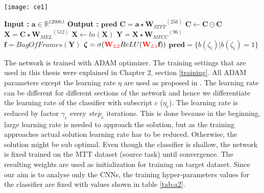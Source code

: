\begin{algorithm}
\begin{minipage}{0.15\textwidth}
\texttt{[image: ce1]}
\end{minipage}
  \begin{minipage}{0.80\textwidth}
  \caption{$\textbf{pred}$ = $Model$($\textbf{a}$) }\label{exp:a2}
  \begin{algorithmic}[1]
    \Statex \textbf{Input :} $\textbf{a} \in \mathbb{R}^{12000.t}$
    \Statex \textbf{Output :} $\textbf{pred}$ 
    \State $\textbf{C} = \textbf{a} \star {\textbf{W}_{STFT}}^{(256)}$ 
    \State $\textbf{C} \leftarrow \textbf{C} \odot \textbf{C}$
    \State $\textbf{X} = \textbf{C} \star {\textbf{W}_{MEL}}^{(512)}$ 
    \State $\textbf{X} \leftarrow ln(\textbf{X})$
    \State $\textbf{Y} = \textbf{X} \star {\textbf{W}_{MFCC}}^{(96)}$ 
    \State $\textbf{f} = BagOfFrames(\textbf{Y})$ 
    \State $\bm{\zeta} = \sigma ({\color{red} \textbf{W}_{L2}} ReLU ({\color{red}\textbf{W}_{L1}}\textbf{f})) $ 
    \State $\textbf{pred} = \{ b(\zeta_{i}) | b(\zeta_{i}) = 1 \}$ 
  \end{algorithmic}
  \end{minipage}
\end{algorithm}
\FloatBarrier

\noindent The network is trained with ADAM optimizer. The training settings that are used in this thesis were explained in Chapter 2, section \ref{training}. All ADAM parameters except the learning rate $\eta$ are used as proposed in  \cite{adam_o}. The learning rate can be different for different sections of the network and hence we differentiate the learning rate of the classifier with subscript $c$ ($\eta_{c}$). The learning rate is reduced by factor $\gamma_{c}$ every $step_{c}$ iterations. This is done because in the beginning, large learning rate is needed to approach the solution, but as the training approaches actual solution learning rate has to be reduced. Otherwise, the solution might be sub optimal. Even though the classifier is shallow, the network is fixed trained on the MTT dataset (source task) until convergence. The resulting weights are used as initialization for training on target dataset. Since our aim is to analyse only the CNNs, the training hyper-parameters values for the classifier are fixed with values shown in table \ref{tab:a2}.  

